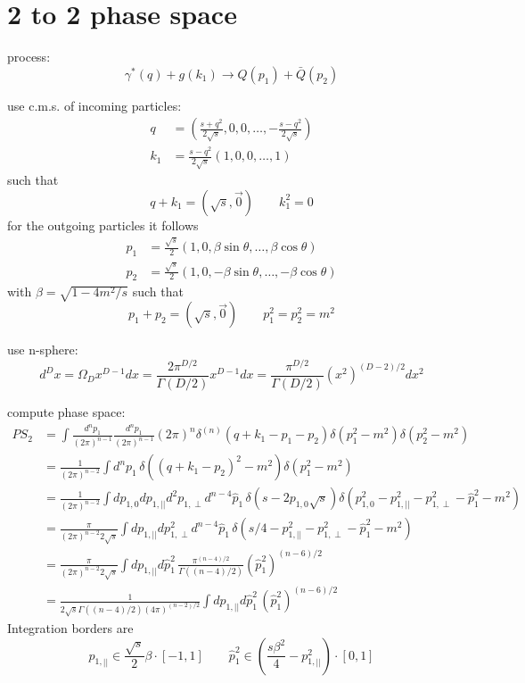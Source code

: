 \documentclass[
  ngerman,		%
  a4paper,		%
  11pt,			%
  DIV=12,		%
  parskip=half  	%
]{scrartcl}
\begin{document}
\section{2 to 2 phase space}

process:
\begin{equation}
\gamma^*(q) + g(k_1) \rightarrow Q(p_1)+\bar{Q}(p_2)
\end{equation}

use c.m.s. of incoming particles:
\begin{align}
q &= \left(\frac {s+q^2}{2\sqrt s},0,0,\ldots,-\frac{s-q^2}{2\sqrt s}\right) \\
k_1 &= \frac {s-q^2}{2\sqrt s}\left(1,0,0,\ldots,1\right)
\end{align}
such that
\begin{equation}
q+k_1 = (\sqrt s,\vec 0)\qquad k_1^2 = 0
\end{equation}
for the outgoing particles it follows
\begin{align}
p_1 &= \frac{\sqrt s} 2 \left(1,0,\beta\sin\theta,\ldots,\beta\cos\theta\right)\\
p_2 &= \frac{\sqrt s} 2 \left(1,0,-\beta\sin\theta,\ldots,-\beta\cos\theta\right)
\end{align}
with $\beta = \sqrt{1-4m^2/s}$ such that
\begin{equation}
p_1+p_2 = (\sqrt s,\vec 0)\qquad p_1^2 = p_2^2 = m^2
\end{equation}

use n-sphere:
\begin{equation}
d^Dx = \Omega_D x^{D-1} dx = \frac{2\pi^{D/2}}{\Gamma(D/2)}x^{D-1} dx= \frac{\pi^{D/2}}{\Gamma(D/2)}(x^2)^{(D-2)/2} dx^2
\end{equation}

compute phase space:
\begin{align}
PS_2 &= \int\!\!\frac{d^np_1}{(2\pi)^{n-1}}\frac{d^np_1}{(2\pi)^{n-1}} (2\pi)^n\delta^{(n)}(q+k_1-p_1-p_2)\delta(p_1^2-m^2)\delta(p_2^2 - m^2)\\
 &= \frac 1 {(2\pi)^{n-2}}\int\!\!d^np_1\,\delta((q+k_1-p_2)^2 -m^2) \delta(p_1^2-m^2)\\
 &= \frac 1 {(2\pi)^{n-2}}\int\!\!dp_{1,0}dp_{1,||}d^2p_{1,\perp}d^{n-4}\hat p_1\,\delta(s-2p_{1,0}\sqrt s) \delta(p_{1,0}^2-p_{1,||}^2 - p_{1,\perp}^2 - \hat p_1^2-m^2)\\
 &= \frac \pi {(2\pi)^{n-2} 2\sqrt s}\int\!\!dp_{1,||}dp^2_{1,\perp}d^{n-4}\hat p_1\,\delta(s/4-p_{1,||}^2 - p_{1,\perp}^2 - \hat p_1^2-m^2)\\
 &= \frac \pi {(2\pi)^{n-2} 2\sqrt s}\int\!\!dp_{1,||}d\hat p_1^2\,\frac{\pi^{(n-4)/2}}{\Gamma((n-4)/2)}(\hat p_1^2)^{(n-6)/2}\\
 &= \frac 1 {2\sqrt s\Gamma((n-4)/2)(4\pi)^{(n-2)/2}}\int\!\!dp_{1,||}d\hat p_1^2\,(\hat p_1^2)^{(n-6)/2}
\end{align}
Integration borders are
\begin{equation}
p_{1,||} \in \frac {\sqrt s} 2\beta \cdot [-1,1] \qquad \hat p_1^2 \in \left(\frac{s \beta^2}{4}-p_{1,||}^2\right)\cdot [0,1]
\end{equation}
\end{document}
